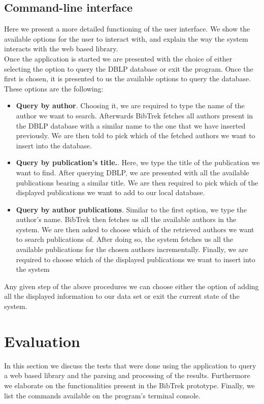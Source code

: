 \documentclass[twocolumn]{article}
\begin{document}
\subsection{Command-line interface}
Here we present a more detailed functioning of the user interface. We show the available options for the user to interact with, and explain the way the system interacts with the web based library.
\\[1\baselineskip]
Once the application is started we are presented with the choice of either selecting the option to query the DBLP database or exit the program. Once the first is chosen, it is presented to us the available options to query the database. These options are the following:

\begin{itemize}
\item \textbf{Query by author}. Choosing it, we are required to type the name of the author we want to search. Afterwards BibTrek fetches all authors present in the DBLP database with a similar name to the one that we have inserted previously. We are then told to pick which of the fetched authors we want to insert into the database.
\item \textbf{Query by publication's title.}. Here, we type the title of the publication we want to find. After querying DBLP, we are presented with all the available publications bearing a similar title. We are then required to pick which of the displayed publications we want to add to our local database.
\item \textbf{Query by author publications}. Similar to the first option, we type the author's name. BibTrek then fetches us all the available authors in the system. We are then asked to choose which of the retrieved authors we want to search publications of. After doing so, the system fetches us all the available publications for the chosen authors incrementally. Finally, we are required to choose which of the displayed publications we want to insert into the system
\end{itemize}
Any given step of the above procedures we can choose either the option of adding all the displayed information to our data set or exit the current state of the system.

\section{Evaluation}
In this section we discuss the tests that were done using the application to query a web based library and the parsing and processing of the results. Furthermore we elaborate on the functionalities present in the BibTrek prototype. Finally, we list the commands available on the program's terminal console.
\end{document}
